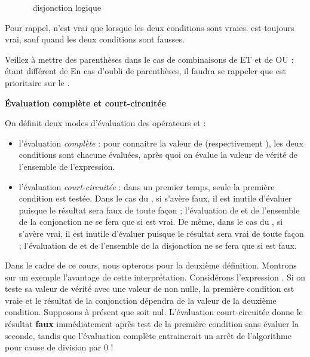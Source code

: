 {
\ \  \ \ \ \ disjonction logique}

{
Pour rappel,  n’est vrai que lorsque
les deux conditions sont vraies.  est
toujours vrai, sauf quand les deux conditions sont fausses.}

{
Veillez à mettre des parenthèses dans le cas de combinaisons de ET et de
OU :  étant différent de
 En cas
d'oubli de parenthèses, il faudra se rappeler que
 est prioritaire sur le . }

{\sffamily\bfseries\upshape
Évaluation complète et court-circuitée}

{
On définit deux modes d’évaluation des opérateurs 
et  :}

\liststyleListv
\begin{itemize}
\item {
l’évaluation \textit{complète} : pour connaitre la valeur de
 (respectivement
), les deux conditions sont chacune
évaluées, après quoi on évalue la valeur de vérité de l’ensemble de
l'expression.}
\item {
l’évaluation \textit{court-circuitée} : dans un premier temps, seule la
première condition est testée. Dans le cas du ,
si  s’avère faux, il est inutile d’évaluer
 puisque le résultat sera faux de toute façon
; l’évaluation de  et de l’ensemble de la
conjonction ne se fera que si  est vrai. De
même, dans le cas du , si
 s’avère vrai, il est inutile d’évaluer
 puisque le résultat sera vrai de toute façon
; l’évaluation de  et de l’ensemble de la
disjonction ne se fera que si  est faux. }
\end{itemize}
{
Dans le cadre de ce cours, nous opterons pour la deuxième définition.
Montrons sur un exemple l’avantage de cette interprétation. Considérons
l’expression 
\textstyleCodeInsr{${\neq}$}. Si on teste sa valeur de vérité avec une
valeur de  non nulle, la première condition est
vraie et le résultat de la conjonction dépendra de la valeur de la
deuxième condition. Supposons à présent que  soit
nul. L’évaluation court-circuitée donne le résultat \textbf{faux}
immédiatement après test de la première condition sans évaluer la
seconde, tandis que l’évaluation complète entrainerait un arrêt de
l’algorithme pour cause de division par 0 ! }

